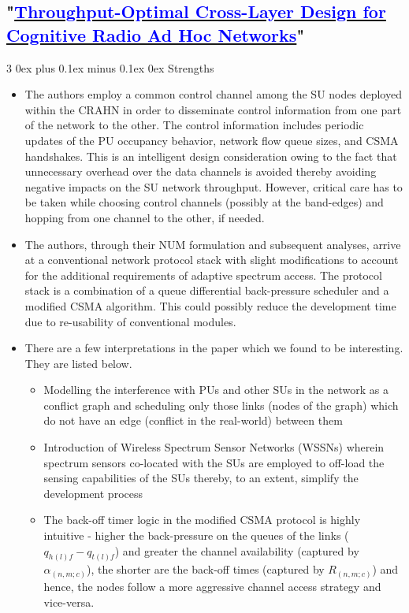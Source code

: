 \documentclass[12pt, draftcls, onecolumn]{IEEEtran}
\makeatletter
\def\subsubsection{\@startsection{subsubsection}%
                                 {3}%
                                 {\z@}%
                                 {0ex plus 0.1ex minus 0.1ex}%
                                 {0ex}%
                                 {\normalfont\normalsize\bfseries}}%
\makeatother
\begin{document}
\subsection{"\href{http://ieeexplore.ieee.org/stamp/stamp.jsp?tp=&arnumber=6881740&isnumber=7180482}{\textcolor{blue}{Throughput-Optimal Cross-Layer Design for Cognitive Radio Ad Hoc Networks}}"}
\subsubsection{Strengths}
\begin{itemize}
    \item The authors employ a common control channel among the SU nodes deployed within the CRAHN in order to disseminate control information from one part of the network to the other. The control information includes periodic updates of the PU occupancy behavior, network flow queue sizes, and CSMA handshakes. This is an intelligent design consideration owing to the fact that unnecessary overhead over the data channels is avoided thereby avoiding negative impacts on the SU network throughput. However, critical care has to be taken while choosing control channels (possibly at the band-edges) and hopping from one channel to the other, if needed.
    \item The authors, through their NUM formulation and subsequent analyses, arrive at a conventional network protocol stack with slight modifications to account for the additional requirements of adaptive spectrum access. The protocol stack is a combination of a queue differential back-pressure scheduler and a modified CSMA algorithm. This could possibly reduce the development time due to re-usability of conventional modules.
    \item There are a few interpretations in the paper which we found to be interesting. They are listed below.
    \begin{itemize}
        \item Modelling the interference with PUs and other SUs in the network as a conflict graph and scheduling only those links (nodes of the graph) which do not have an edge (conflict in the real-world) between them
        \item Introduction of Wireless Spectrum Sensor Networks (WSSNs) wherein spectrum sensors co-located with the SUs are employed to off-load the sensing capabilities of the SUs thereby, to an extent, simplify the development process
        \item The back-off timer logic in the modified CSMA protocol is highly intuitive - higher the back-pressure on the queues of the links ($q_{h(l)f} - q_{t(l)f}$) and greater the channel availability (captured by $\alpha_{(n,m;c)}$), the shorter are the back-off times (captured by $R_{(n,m;c)}$) and hence, the nodes follow a more aggressive channel access strategy and vice-versa.
    \end{itemize}
\end{itemize}
\end{document}
